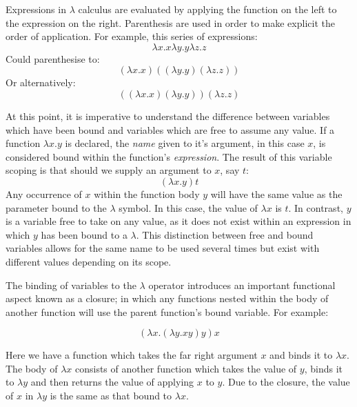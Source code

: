 \documentclass[12pt,a4paper]{article}
\begin{document}
Expressions in $\lambda$ calculus are evaluated by applying the function on the left to the expression on the right. Parenthesis are used in order to make explicit the order of application. For example, this series of expressions:
\begin{displaymath}
    \lambda x.x \lambda y.y \lambda z.z
\end{displaymath}
Could parenthesise to:
\begin{displaymath}
    (\lambda x.x) ((\lambda y.y) (\lambda z.z))
\end{displaymath}
Or alternatively:
\begin{displaymath}
    ((\lambda x.x) (\lambda y.y)) (\lambda z.z)
\end{displaymath}

At this point, it is imperative to understand the difference between variables which have been bound and variables which are free to assume any value. If a function $\lambda x.y$ is declared, the \emph{name} given to it's argument, in this case $x$, is considered bound within the function's \emph{expression}. The result of this variable scoping is that should we supply an argument to $x$, say $t$:
\begin{displaymath}
    (\lambda x.y)t
\end{displaymath}
Any occurrence of $x$ within the function body $y$ will have the same value as the parameter bound to the $\lambda$ symbol. In this case, the value of $\lambda x$ is $t$. In contrast, $y$ is a variable free to take on any value, as it does not exist within an expression in which $y$ has been bound to a $\lambda$. This distinction between free and bound variables allows for the same name to be used several times but exist with different values depending on its scope.

The binding of variables to the $\lambda$ operator introduces an important functional aspect known as a closure; in which any functions nested within the body of another function will use the parent function's bound variable. For example:

\begin{displaymath}
    ( \lambda x.(\lambda y.xy)y)x
\end{displaymath}

Here we have a function which takes the far right argument $x$ and binds it to $\lambda x$. The body of $\lambda x$ consists of another function which takes the value of $y$, binds it to $\lambda y$ and then returns the value of applying $x$ to $y$. Due to the closure, the value of $x$ in $\lambda y$ is the same as that bound to $\lambda x$.
\end{document}

